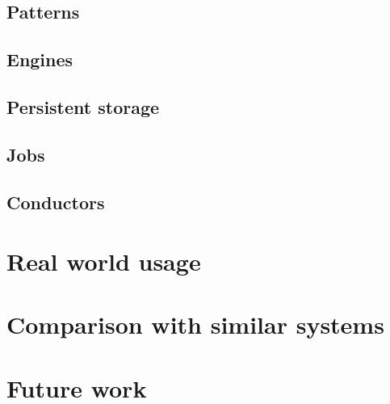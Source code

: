\documentclass[11pt,a4paper]{article}
\begin{document}
\subsection{Patterns}

\subsection{Engines}

\subsection{Persistent storage}

\subsection{Jobs}

\subsection{Conductors}

\section{Real world usage}

\section{Comparison with similar systems}

\section{Future work}
\end{document}
